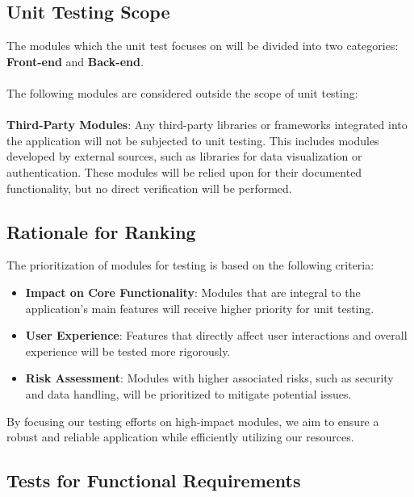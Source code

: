 \documentclass[12pt, titlepage]{article}
\begin{document}
\subsection{Unit Testing Scope}
The modules which the unit test focuses on will be divided into two categories: \textbf{Front-end} and \textbf{Back-end}.\\\\
The following modules are considered outside the scope of unit testing:\\\\
\textbf{Third-Party Modules}: 
Any third-party libraries or frameworks integrated into the application will not be subjected to unit testing. This includes modules developed by external sources, such as libraries for data visualization or authentication. These modules will be relied upon for their documented functionality, but no direct verification will be performed.


\subsection{Rationale for Ranking}
The prioritization of modules for testing is based on the following criteria:
\begin{itemize}
    \item \textbf{Impact on Core Functionality}: Modules that are integral to the application’s main features will receive higher priority for unit testing.
    \item \textbf{User Experience}: Features that directly affect user interactions and overall experience will be tested more rigorously.
    \item \textbf{Risk Assessment}: Modules with higher associated risks, such as security and data handling, will be prioritized to mitigate potential issues.
\end{itemize}

By focusing our testing efforts on high-impact modules, we aim to ensure a robust and reliable application while efficiently utilizing our resources.


\subsection{Tests for Functional Requirements}
\end{document}

